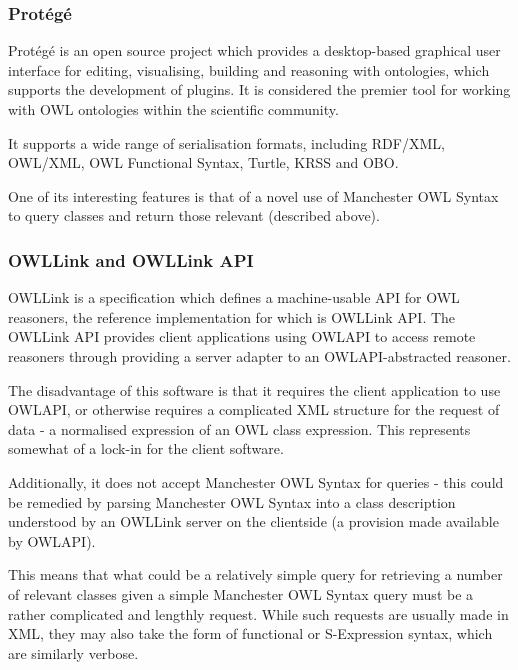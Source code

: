 \documentclass{article}
\begin{document}
\subsubsection{Protégé}

Protégé is an open source project which provides a desktop-based graphical user
interface for editing, visualising, building and reasoning with ontologies, which supports
the development of plugins. It is considered the premier tool for working with
OWL ontologies within the scientific community.

It supports a wide range of serialisation formats, including RDF/XML, OWL/XML,
OWL Functional Syntax, Turtle, KRSS and OBO.

One of its interesting features is that of a novel use of Manchester OWL Syntax
to query classes and return those relevant (described above).

\subsubsection{OWLLink and OWLLink API}

OWLLink is a specification which defines a machine-usable API for OWL reasoners,
the reference implementation for which is OWLLink API. The OWLLink API provides
client applications using OWLAPI to access remote reasoners through providing a
server adapter to an OWLAPI-abstracted reasoner. 

The disadvantage of this software is that it requires the client application
to use OWLAPI, or otherwise requires a complicated XML structure for the
request of data - a normalised expression of an OWL class expression. This
represents somewhat of a lock-in for the client software. 

Additionally, it does not accept Manchester OWL Syntax for queries - this could 
be remedied by parsing Manchester OWL Syntax into a class description understood 
by an OWLLink server on the clientside (a provision made available by OWLAPI).

This means that what could be a relatively simple query for retrieving a number
of relevant classes given a simple Manchester OWL Syntax query must be a rather
complicated and lengthly request. While such requests are usually made in XML,
they may also take the form of functional or S-Expression syntax, which
are similarly verbose.
\end{document}
